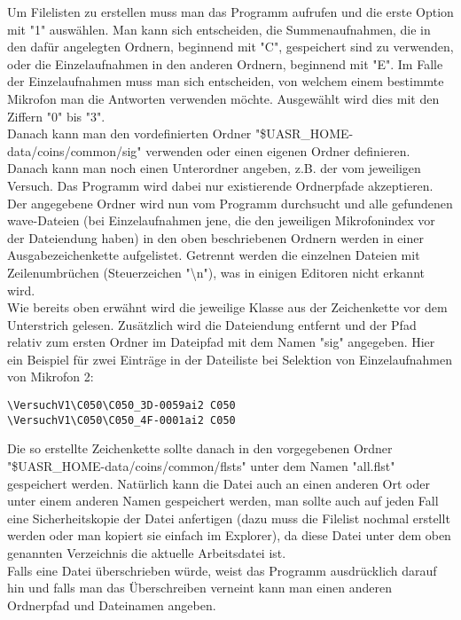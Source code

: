 Um Filelisten zu erstellen muss man das Programm aufrufen und die erste Option mit "1" auswählen. Man kann sich entscheiden, die Summenaufnahmen, die in den dafür angelegten Ordnern, beginnend mit "C", gespeichert sind zu verwenden, oder die Einzelaufnahmen in den anderen Ordnern, beginnend mit "E". Im Falle der Einzelaufnahmen muss man sich entscheiden, von welchem einem bestimmte Mikrofon man die Antworten verwenden möchte. Ausgewählt wird dies mit den Ziffern "0" bis "3". \\
Danach kann man den vordefinierten Ordner "\$UASR\_HOME-data/coins/common/sig" verwenden oder einen eigenen Ordner  definieren. Danach kann man noch einen Unterordner angeben, z.B. der vom jeweiligen Versuch. Das Programm wird dabei nur existierende Ordnerpfade akzeptieren. \\
Der angegebene Ordner wird nun vom Programm durchsucht und alle gefundenen wave-Dateien (bei Einzelaufnahmen jene, die den jeweiligen Mikrofonindex vor der Dateiendung haben) in den oben beschriebenen Ordnern werden in einer Ausgabezeichenkette aufgelistet. Getrennt werden die einzelnen Dateien mit Zeilenumbrüchen (Steuerzeichen "\textbackslash n"), was in einigen Editoren nicht erkannt wird. \\ 
Wie bereits oben erwähnt wird die jeweilige Klasse aus der Zeichenkette vor dem Unterstrich gelesen. Zusätzlich wird die Dateiendung entfernt und der Pfad relativ zum ersten Ordner im Dateipfad mit dem Namen "sig" angegeben.
Hier ein Beispiel für zwei Einträge in der Dateiliste bei Selektion von Einzelaufnahmen von Mikrofon 2:
\begin{bsp}
\texttt{\textbackslash VersuchV1\textbackslash C050\textbackslash C050\_3D-0059ai2 C050 \\
\textbackslash VersuchV1\textbackslash C050\textbackslash C050\_4F-0001ai2 C050}
\end{bsp}

Die so erstellte Zeichenkette sollte danach in den vorgegebenen Ordner "\$UASR\_HOME-data/coins/common/flsts" unter dem Namen "all.flst" gespeichert werden. Natürlich kann die Datei auch an einen anderen Ort oder unter einem anderen Namen gespeichert werden, man sollte auch auf jeden Fall eine Sicherheitskopie der Datei anfertigen (dazu muss die Filelist nochmal erstellt werden oder man kopiert sie einfach im Explorer), da diese Datei unter dem oben genannten Verzeichnis die aktuelle Arbeitsdatei ist.\\
Falls eine Datei überschrieben würde, weist das Programm ausdrücklich darauf hin und falls man das Überschreiben verneint kann man einen anderen Ordnerpfad und Dateinamen angeben.

